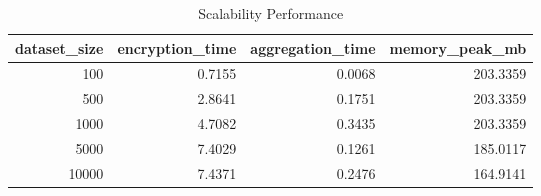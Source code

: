 \begin{table}[htbp]
\centering
\caption{Scalability Performance}
\label{tab:scalability}
\begin{tabular}{rrrr}
\toprule
dataset_size & encryption_time & aggregation_time & memory_peak_mb \\
\midrule
100 & 0.7155 & 0.0068 & 203.3359 \\
500 & 2.8641 & 0.1751 & 203.3359 \\
1000 & 4.7082 & 0.3435 & 203.3359 \\
5000 & 7.4029 & 0.1261 & 185.0117 \\
10000 & 7.4371 & 0.2476 & 164.9141 \\
\bottomrule
\end{tabular}
\end{table}
